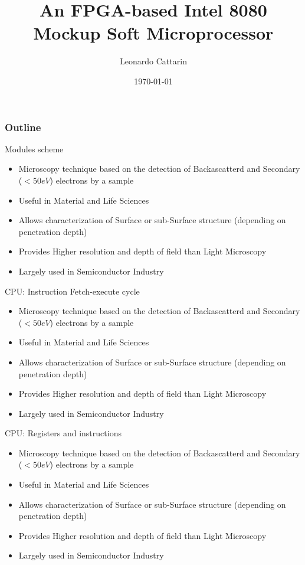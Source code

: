 \documentclass{beamer}
\title{An FPGA-based Intel 8080 Mockup Soft Microprocessor}
\date{\today}
\author{Leonardo Cattarin}
\institute{University of Trento}
\begin{document}
  \maketitle

  \begin{frame}
    \frametitle{Outline}
    \tableofcontents
  \end{frame}


  \begin{frame}{Modules scheme}
    \begin{itemize}
        \item Microscopy technique based on the detection of Backascatterd and Secondary ($<50eV$) electrons by a sample
        \item Useful in Material and Life Sciences
        \item Allows characterization of Surface or sub-Surface structure (depending on penetration depth)
        \item Provides Higher resolution and depth of field than Light Microscopy 
        \item Largely used in Semiconductor Industry
    \end{itemize}
  \end{frame}

  \begin{frame}{CPU: Instruction Fetch-execute cycle}
    \begin{itemize}
        \item Microscopy technique based on the detection of Backascatterd and Secondary ($<50eV$) electrons by a sample
        \item Useful in Material and Life Sciences
        \item Allows characterization of Surface or sub-Surface structure (depending on penetration depth)
        \item Provides Higher resolution and depth of field than Light Microscopy 
        \item Largely used in Semiconductor Industry
    \end{itemize}
  \end{frame}

  \begin{frame}{CPU: Registers and instructions}
    \begin{itemize}
        \item Microscopy technique based on the detection of Backascatterd and Secondary ($<50eV$) electrons by a sample
        \item Useful in Material and Life Sciences
        \item Allows characterization of Surface or sub-Surface structure (depending on penetration depth)
        \item Provides Higher resolution and depth of field than Light Microscopy 
        \item Largely used in Semiconductor Industry
    \end{itemize}
  \end{frame}
\end{document}
